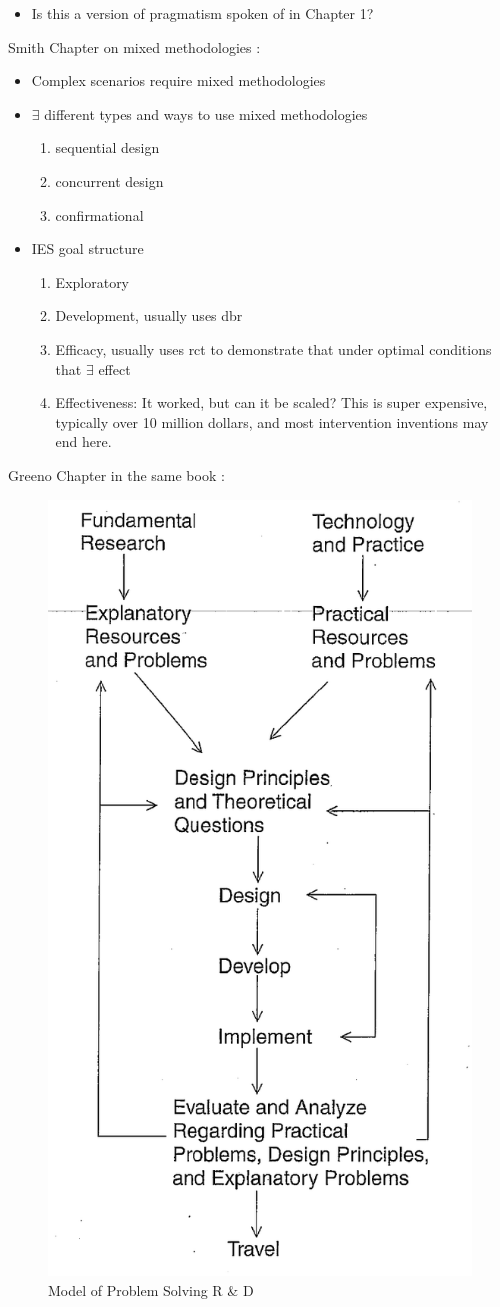 \documentclass{TC}
\begin{document}
	\begin{itemize}[(??)]
	\item Is this a version of pragmatism spoken of in Chapter 1?
	\end{itemize}

Smith Chapter on mixed methodologies \parencite{green_multiple_2006}: 
\begin{itemize}
\item Complex scenarios require mixed methodologies
\item $\exists$ different types and ways to use mixed methodologies
	\begin{enumerate}
	\item sequential design
	\item concurrent design
	\item confirmational
	\end{enumerate}
	
\item \gls{IES} goal structure
	\begin{enumerate}
	\item Exploratory
	\item Development, usually uses \gls{dbr}
	\item Efficacy, usually uses \gls{rct} to demonstrate that under optimal conditions that $\exists$ effect
	\item Effectiveness: It worked, but can it be scaled? This is super expensive, typically over 10 million dollars, and most intervention inventions may end here.
	\end{enumerate}
\end{itemize}
Greeno Chapter in the same book \parencite{green_theoretical_2006}:

\begin{figure}[h]
\centering
\includegraphics[width=.4\textwidth]{greeno_model_problem_solving_RandD.png}
\caption{Model of Problem Solving R \& D \parencite{green_theoretical_2006}}
\label{fig:Model_of Problem_Solving_R_and_D}
\end{figure}
\end{document}
